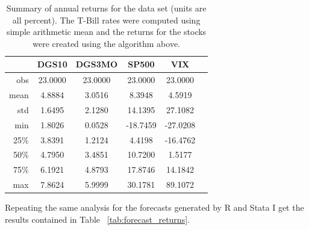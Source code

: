 \documentclass[a4paper, 11pt, twoside]{article}
\theoremstyle{definition} %
\numberwithin{equation}{section}
\begin{document}
  \begin{table}[h!]
    \begin{center}
      \begin{tabular}{r|ccccc}
      \hline
      \rowcolor{gray!45}  & DGS10 & DGS3MO & SP500 & VIX \\
      \hline
      \hline
      \rowcolor{gray!7} obs & 23.0000 & 23.0000 & 23.0000 & 23.0000 \\
      \rowcolor{gray!23} mean & 4.8884 & 3.0516 & 8.3948 & 4.5919 \\
      \rowcolor{gray!7} std & 1.6495 & 2.1280 & 14.1395 & 27.1082 \\
      \rowcolor{gray!23} min & 1.8026 & 0.0528 & -18.7459 & -27.0208 \\
      \rowcolor{gray!7} 25\% & 3.8391 & 1.2124 & 4.4198 & -16.4762 \\
      \rowcolor{gray!23} 50\% & 4.7950 & 3.4851 & 10.7200 & 1.5177 \\
      \rowcolor{gray!7} 75\% & 6.1921 & 4.8793 & 17.8746 & 14.1842 \\
      \rowcolor{gray!23} max & 7.8624 & 5.9999 & 30.1781 & 89.1072 \\
      \bottomrule
      \end{tabular}
      \captionsetup{width=5.5in}
      \caption{\small Summary of annual returns for the data set (units are all percent). The T-Bill rates were computed using simple arithmetic mean and the returns for the stocks were created using the algorithm above.}
      \label{tab:describereturns}
    \end{center}
  \end{table}

  Repeating the same analysis for the forecasts generated by R and Stata I get the results contained in Table ~\ref{tab:forecast_returns}.
\end{document}
